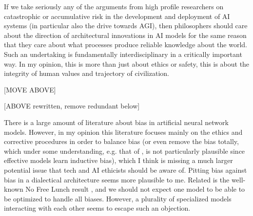 \documentclass[11pt, oneside]{article}   	%
\begin{document}
If we take seriously any of the arguments from high profile researchers on catastrophic or accumulative risk in the development and deployment of AI systems (in particular also the drive towards AGI), then philosophers should care about the direction of architectural innovations in AI models for the same reason that they care about what processes produce reliable knowledge about the world.  Such an undertaking is fundamentally interdisciplinary in a critically important way.  In my opinion, this is more than just about ethics or safety, this is about the integrity of human values and trajectory of civilization.


[MOVE ABOVE]






[ABOVE rewritten, remove redundant below]









There is a large amount of literature about bias in artificial neural network models.  However, in my opinion this literature focuses mainly on the ethics and corrective procedures in order to balance bias (or even remove the bias totally, which under some  understanding, e.g. that of \citep{Mitchell1980}, is not particularly plausible since effective models learn inductive bias), which I think is missing a much larger potential issue that tech and AI ethicists should be aware of.  Pitting bias against bias in a dialectical architecture seems more plausible to me.  Related is the well-known No Free Lunch result \citep{Wolpertetal1997}, and we should not expect one model to be able to be optimized to handle all biases.  However, a plurality of specialized models interacting with each other seems to escape such an objection.
\end{document}
